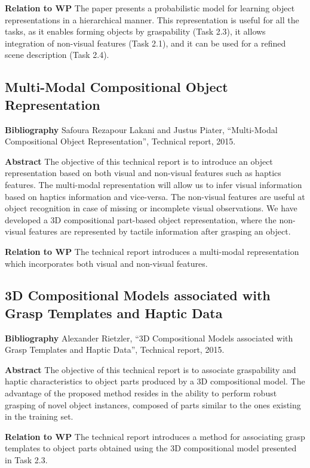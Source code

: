 \documentclass[a4paper,11pt,pdf]{../templates/pacmanreport}
\begin{document}
\textbf{Relation to WP}
The paper presents a probabilistic model for learning object representations in a hierarchical manner. This representation is useful for all the tasks, as it enables forming objects by graspability (Task 2.3), it allows integration of non-visual features (Task 2.1), and it can be used for a refined scene description (Task 2.4).

\newpage
 
\subsection{Multi-Modal Compositional Object Representation}
\label{ann:techReport} 
\textbf{Bibliography} Safoura Rezapour Lakani and Justus Piater, “Multi-Modal Compositional Object Representation”, Technical report, 2015.
 
\textbf{Abstract} The objective of this technical report is to introduce an object representation based on both visual and non-visual features such as haptics features. The multi-modal representation will allow us to infer visual information based on haptics information and vice-versa. The non-visual features are useful at object recognition in case of missing or incomplete visual observations. We have developed a 3D compositional part-based object representation, where the non-visual features are represented by tactile information after grasping an object.

\textbf{Relation to WP}
The technical report introduces a multi-modal representation which incorporates both visual and non-visual features.

\newpage

\subsection{3D Compositional Models associated with Grasp Templates and Haptic Data}
\label{ann:techReportAlex} 
\textbf{Bibliography} Alexander Rietzler, “3D Compositional Models associated with Grasp Templates and Haptic Data”, Technical report, 2015.
 
\textbf{Abstract} The objective of this technical report is to associate graspability and haptic characteristics to object parts produced by a 3D compositional model. The advantage of the proposed method resides in the ability to perform robust grasping of novel object instances, composed of parts similar to the ones existing in the training set.

\textbf{Relation to WP}
The technical report introduces a method for associating grasp templates to object parts obtained using the 3D compositional model presented in Task 2.3.

\newpage 
 




\end{document}
